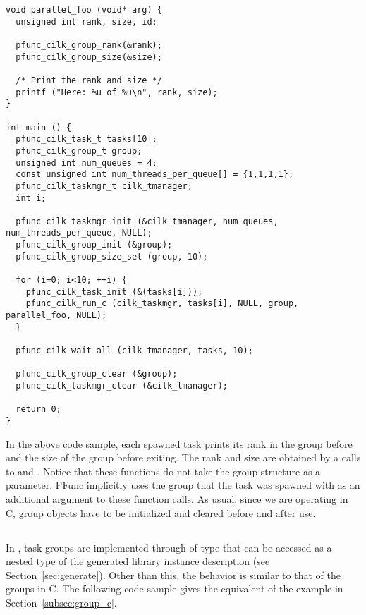 \begin{lstlisting}
void parallel_foo (void* arg) {
  unsigned int rank, size, id;

  pfunc_cilk_group_rank(&rank);
  pfunc_cilk_group_size(&size);

  /* Print the rank and size */
  printf ("Here: %u of %u\n", rank, size);
}

int main () {
  pfunc_cilk_task_t tasks[10];
  pfunc_cilk_group_t group;
  unsigned int num_queues = 4;
  const unsigned int num_threads_per_queue[] = {1,1,1,1};
  pfunc_cilk_taskmgr_t cilk_tmanager;
  int i;

  pfunc_cilk_taskmgr_init (&cilk_tmanager, num_queues, num_threads_per_queue, NULL);
  pfunc_cilk_group_init (&group);
  pfunc_cilk_group_size_set (group, 10);

  for (i=0; i<10; ++i) {
    pfunc_cilk_task_init (&(tasks[i]));
    pfunc_cilk_run_c (cilk_taskmgr, tasks[i], NULL, group, parallel_foo, NULL);
  }

  pfunc_cilk_wait_all (cilk_tmanager, tasks, 10);

  pfunc_cilk_group_clear (&group);
  pfunc_cilk_taskmgr_clear (&cilk_tmanager);

  return 0;
}
\end{lstlisting}

In the above code sample, each spawned task prints its rank in the group before
and the size of the group before exiting. The rank and size are obtained by a
calls to  and . Notice
that these functions do not take the group structure as a parameter. PFunc
implicitly uses the group that the task was spawned with as an additional
argument to these function calls. As usual, since we are operating in C, group
objects have to be initialized and cleared before and after use.

\subsection{\Cpp{}}
\label{subsec:group_cxx}
In \Cpp{}, task groups are implemented through of type  that can 
be accessed as a nested type of the generated library instance description (see
Section~\ref{sec:generate}). Other than this, the behavior is similar to that 
of the groups in C. The following code sample gives the \Cpp{} equivalent of the
example in Section~\ref{subsec:group_c}.

